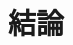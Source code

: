\documentclass[../main.tex]{subfiles}
\begin{document}
\section{結論}
\label{sec:conclusion}
\end{document}
